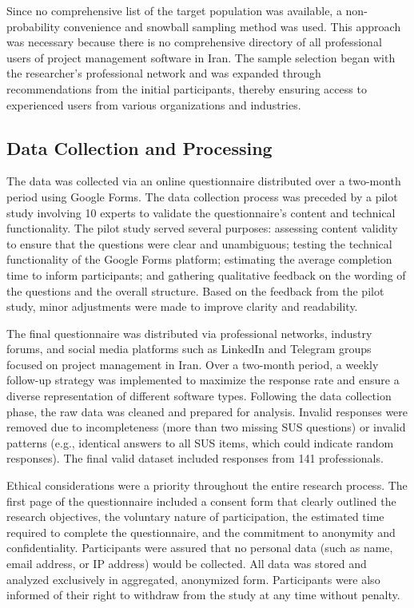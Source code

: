 \documentclass[runningheads]{llncs}
\begin{document}
Since no comprehensive list of the target population was available, a non-probability convenience and snowball sampling method was used. This approach was necessary because there is no comprehensive directory of all professional users of project management software in Iran. The sample selection began with the researcher’s professional network and was expanded through recommendations from the initial participants, thereby ensuring access to experienced users from various organizations and industries.


\subsection{Data Collection and Processing}
The data was collected via an online questionnaire distributed over a two-month period using Google Forms. The data collection process was preceded by a pilot study involving 10 experts to validate the questionnaire’s content and technical functionality. The pilot study served several purposes: assessing content validity to ensure that the questions were clear and unambiguous; testing the technical functionality of the Google Forms platform; estimating the average completion time to inform participants; and gathering qualitative feedback on the wording of the questions and the overall structure. Based on the feedback from the pilot study, minor adjustments were made to improve clarity and readability.


The final questionnaire was distributed via professional networks, industry forums, and social media platforms such as LinkedIn and Telegram groups focused on project management in Iran. Over a two-month period, a weekly follow-up strategy was implemented to maximize the response rate and ensure a diverse representation of different software types. Following the data collection phase, the raw data was cleaned and prepared for analysis. Invalid responses were removed due to incompleteness (more than two missing SUS questions) or invalid patterns (e.g., identical answers to all SUS items, which could indicate random responses). The final valid dataset included responses from 141 professionals.


Ethical considerations were a priority throughout the entire research process. The first page of the questionnaire included a consent form that clearly outlined the research objectives, the voluntary nature of participation, the estimated time required to complete the questionnaire, and the commitment to anonymity and confidentiality. Participants were assured that no personal data (such as name, email address, or IP address) would be collected. All data was stored and analyzed exclusively in aggregated, anonymized form. Participants were also informed of their right to withdraw from the study at any time without penalty.
\end{document}
